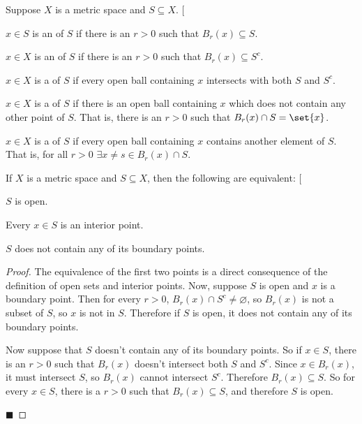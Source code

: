 \documentclass[10pt]{article}
\makeatletter
\def\@blist[#1]{%
    \bgroup\bgroup\par\vskip-\medskipamount%
    \gdef\item{%
        \par\egroup\bgroup\medskip\setbox0=\hbox{#1\quad}%
        \advance\leftskip by \wd0\leavevmode\kern-\wd0\box0%
    }%
}
\def\blist{\@ifnextchar[ \@blist {\@blist[$\bullet$]}}
\def\elist{\par\egroup\egroup\medskip}
\makeatother
\begin{document}
\begin{defn*}

    Suppose $X$ is a metric space and $S\subseteq X$.
    \blist
        \item $x\in S$ is an  of $S$ if there is an $r>0$ such that $B_r(x)\subseteq S$.
        \item $x\in X$ is an  of $S$ if there is an $r>0$ such that $B_r(x)\subseteq S^c$.
        \item $x\in X$ is a   of $S$ if every open ball containing $x$ intersects with both $S$ and $S^c$.
        \item $x\in X$ is a   of $S$ if there is an open ball containing $x$ which does not contain any other point of $S$.
            That is, there is an $r>0$ such that $B_r(x)\cap S=\set{x}$.
        \item $x\in X$ is a   of $S$ if every open ball containing $x$ contains another element of $S$.
            That is, for all $r>0$ $\exists x\neq s\in B_r(x)\cap S$.
    \elist

\end{defn*}

\begin{prop*}

    If $X$ is a metric space and $S\subseteq X$, then the following are equivalent:
    \blist
        \item $S$ is open.
        \item Every $x\in S$ is an interior point.
        \item $S$ does not contain any of its boundary points.
    \elist

\end{prop*}

\begin{proof}

    The equivalence of the first two points is a direct consequence of the definition of open sets and interior points.
    Now, suppose $S$ is open and $x$ is a boundary point.
    Then for every $r>0$, $B_r(x)\cap S^c\neq\varnothing$, so $B_r(x)$ is not a subset of $S$, so $x$ is not in $S$.
    Therefore if $S$ is open, it does not contain any of its boundary points.
    
    Now suppose that $S$ doesn't contain any of its boundary points.
    So if $x\in S$, there is an $r>0$ such that $B_r(x)$ doesn't intersect both $S$ and $S^c$.
    Since $x\in B_r(x)$, it must intersect $S$, so $B_r(x)$ cannot intersect $S^c$.
    Therefore $B_r(x)\subseteq S$.
    So for every $x\in S$, there is a $r>0$ such that $B_r(x)\subseteq S$, and therefore $S$ is open.

    \hfill$\blacksquare$

\end{proof}
\end{document}
